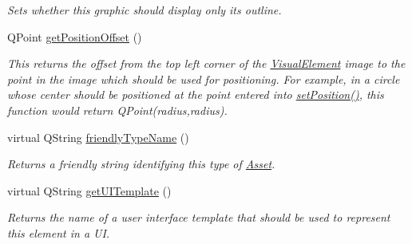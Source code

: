 \begin{DoxyCompactItemize}
\begin{DoxyCompactList}\small\item\em Sets whether this graphic should display only its outline. \end{DoxyCompactList}\item 
\hypertarget{class_picto_1_1_ellipse_graphic_ad9068fbfd5c2ac3d734e705e62a92259}{Q\-Point \hyperlink{class_picto_1_1_ellipse_graphic_ad9068fbfd5c2ac3d734e705e62a92259}{get\-Position\-Offset} ()}\label{class_picto_1_1_ellipse_graphic_ad9068fbfd5c2ac3d734e705e62a92259}

\begin{DoxyCompactList}\small\item\em This returns the offset from the top left corner of the \hyperlink{struct_picto_1_1_visual_element}{Visual\-Element} image to the point in the image which should be used for positioning. For example, in a circle whose center should be positioned at the point entered into \hyperlink{struct_picto_1_1_visual_element_a454cc96862097e96a0b0f1d2c83e23ed}{set\-Position()}, this function would return Q\-Point(radius,radius). \end{DoxyCompactList}\item 
virtual Q\-String \hyperlink{class_picto_1_1_ellipse_graphic_aaef193b78f2354a43ced06317d17c2bc}{friendly\-Type\-Name} ()
\begin{DoxyCompactList}\small\item\em Returns a friendly string identifying this type of \hyperlink{class_picto_1_1_asset}{Asset}. \end{DoxyCompactList}\item 
\hypertarget{class_picto_1_1_ellipse_graphic_ab45ea6853584add27ca05eaf295af419}{virtual Q\-String \hyperlink{class_picto_1_1_ellipse_graphic_ab45ea6853584add27ca05eaf295af419}{get\-U\-I\-Template} ()}\label{class_picto_1_1_ellipse_graphic_ab45ea6853584add27ca05eaf295af419}

\begin{DoxyCompactList}\small\item\em Returns the name of a user interface template that should be used to represent this element in a U\-I. \end{DoxyCompactList}\end{DoxyCompactItemize}
